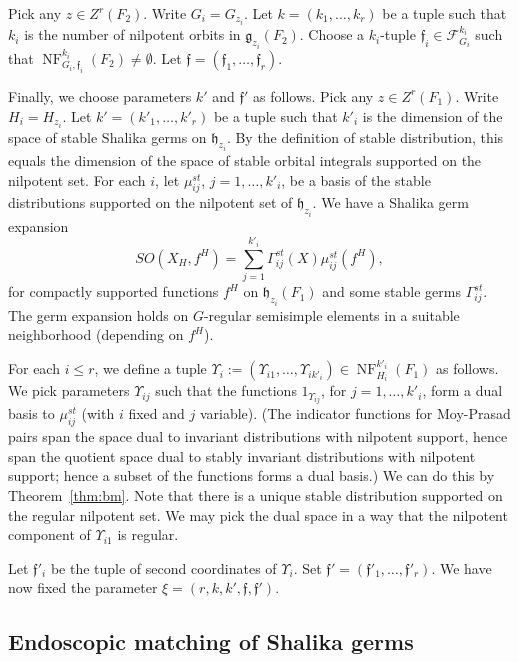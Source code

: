 \documentclass[12pt]{amsart}
\newcommand{\op}[1]{\operatorname{#1}}
\def\NF{\op{NF}}
\def\Y{\Upsilon}
\def\s{{\mathfrak{f}}}
\newcommand{\cF}{\mathcal{F}}
\newcommand{\fg}{\mathfrak{g}}
\newcommand{\fh}{\mathfrak{h}}
\theoremstyle{plain}
\theoremstyle{definition}
\begin{document}

Pick any $z\in Z^r(F_2)$.  Write $G_i=G_{z_i}$.  Let
$k=(k_1,\ldots,k_r)$ be a tuple such that $k_i$ is the number of
nilpotent orbits in $\fg_{z_i}(F_2)$.  
Choose a $k_i$-tuple $\s_i\in
\cF_{G_i}^{k_i}$ such that $\NF^{k_i}_{G_i,\s_i}(F_2)\ne \emptyset$.
Let $\s = (\s_1,\ldots,\s_r)$.

Finally, we choose parameters $k'$ and $\s'$ as follows.  Pick any
$z\in Z^r(F_1)$.  Write $H_i = H_{z_i}$. Let $k'=(k'_1,\ldots,k'_r)$
be a tuple such that $k'_i$ is the dimension of the space of stable
Shalika germs on $\fh_{z_i}$.  By the definition of stable
distribution, this equals the dimension of the space of stable orbital
integrals supported on the nilpotent set.  For each $i$, let
$\mu_{ij}^{st}$, $j = 1,\ldots,k'_i$, be a basis of the stable
distributions supported on the nilpotent set of $\fh_{z_i}$.  We have
a Shalika germ expansion
\[
SO(X_H,f^H) = \sum_{j=1}^{k'_i} \Gamma^{st}_{ij}(X) \mu_{ij}^{st}(f^H),
\]
for compactly supported functions $f^H$ on $\fh_{z_i}(F_1)$ and some
stable germs $\Gamma^{st}_{ij}$.  The germ expansion holds on $G$-regular
semisimple elements in a suitable neighborhood (depending on $f^H$).

For each $i\le r$, we define a tuple $\Y_i :=
(\Y_{i1},\ldots,\Y_{ik'_i})\in \NF^{k'_i}_{H_{i}}(F_1)$ as follows.
We pick parameters $\Y_{ij}$ such that the functions $1_{\Y_{ij}}$,
for $j=1,\ldots,k'_i$, form a dual basis to $\mu_{ij}^{st}$ (with $i$
fixed and $j$ variable).  (The indicator functions for Moy-Prasad
pairs span the space dual to invariant distributions with nilpotent
support, hence span the quotient space dual to stably invariant
distributions with nilpotent support; hence a subset of the functions
forms a dual basis.)  We can do this by Theorem~\ref{thm:bm}.  Note
that there is a unique stable distribution supported on the regular
nilpotent set.  We may pick the dual space in a way that the nilpotent
component of $\Y_{i1}$ is regular.

Let $\s'_i$ be the tuple of second coordinates of $\Y_i$.
Set $\s' = (\s'_1,\ldots,\s'_r)$.  We have now fixed the parameter
$\xi=(r,k,k',\s,\s')$.
 
\subsection{Endoscopic matching of Shalika germs}\label{sec:emsg}
\end{document}
